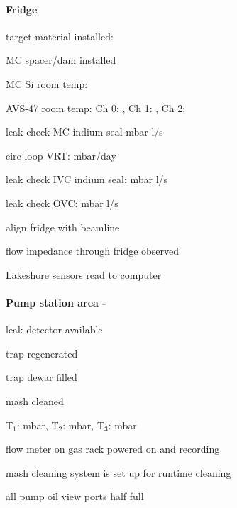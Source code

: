 \begin{appendices}
\begin{minipage}{\textwidth}
\paragraph{Fridge}
\begin{checklist}
 \item target material installed: \blankprompt
 \item MC spacer/dam installed
 \item MC Si room temp: \blankprompt
 \item AVS-47 room temp: Ch 0: \blankprompt, Ch 1: \blankprompt , Ch 2: \blankprompt  
 \item leak check MC indium seal \blankprompt mbar l/s
 \item \het{} circ loop VRT: \blankprompt mbar/day
 \item leak check IVC indium seal: \blankprompt mbar l/s
 \item leak check OVC: \blankprompt mbar l/s
 \item align fridge with beamline
 \item flow impedance through fridge observed
 \item \hef{} Lakeshore sensors read to computer

\end{checklist}
\end{minipage}

\begin{minipage}{\textwidth}
\paragraph{Pump station area - \het}
\begin{checklist}
 \item leak detector available
 \item \lnn{} trap regenerated
 \item \lnn{} trap dewar filled
 \item mash cleaned
 \item T$_1$: \blankprompt mbar, T$_2$: \blankprompt mbar, T$_3$: \blankprompt mbar
 \item flow meter on \het{} gas rack powered on and recording
 \item mash cleaning system is set up for runtime cleaning
 \item all pump oil view ports half full
\end{checklist}
\end{minipage}

\begin{minipage}{\textwidth}

\end{minipage}
\end{appendices}
